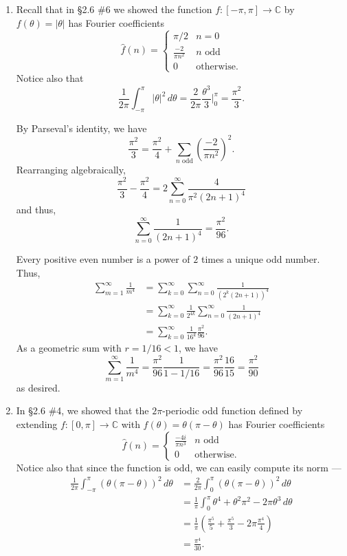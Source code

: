 \documentclass[12 pt, letterpaper]{hmcpset}
\begin{document}
\begin{solution}
	\begin{enumerate}
		\item Recall that in \S 2.6 \#6 we showed the function $f : [-\pi, \pi] \to \mathbb{C}$ by $f(\theta) = \lvert \theta \rvert$ has Fourier coefficients
			\[
				\hat{f}(n) = \begin{cases}
					\pi / 2 & n = 0 \\
					\frac{-2}{\pi n^{2}} & n \text{ odd} \\
					0 & \text{otherwise}.
				\end{cases}
			\]
			Notice also that
			\[
				\frac{1}{2 \pi} \int_{-\pi}^{\pi} \lvert \theta \rvert^{2} \, d\theta = \frac{2}{2 \pi} \frac{\theta^{3}}{3} \Big |_{0}^{\pi} = \frac{\pi^{2}}{3}.
			\]

			By Parseval's identity, we have
			\[
				\frac{\pi^{2}}{3} = \frac{\pi^{2}}{4} + \sum_{n \text{ odd}} \left ( \frac{-2}{\pi n^{2}} \right )^{2}.
			\]
			Rearranging algebraically,
			\[
				\frac{\pi^{2}}{3} - \frac{\pi^{2}}{4} = 2 \sum_{n = 0}^{\infty} \frac{4}{\pi^{2} (2n + 1)^{4}}
			\]
			and thus,
			\[
				\sum_{n = 0}^{\infty} \frac{1}{(2n + 1)^{4}} = \frac{\pi^{2}}{96}.
			\]

			Every positive even number is a power of $2$ times a unique odd number. Thus,
			\begin{align*}
				\sum_{m = 1}^{\infty} \frac{1}{m^{4}} & = \sum_{k = 0}^{\infty} \sum_{n = 0}^{\infty} \frac{1}{(2^{k} (2n + 1))^{4}} \\
								      & = \sum_{k = 0}^{\infty} \frac{1}{2^{4k}} \sum_{n = 0}^{\infty} \frac{1}{(2n + 1)^{4}} \\
								      & = \sum_{k = 0}^{\infty} \frac{1}{16^{k}} \frac{\pi^{2}}{96}.
			\end{align*}
			As a geometric sum with $r = 1/16 < 1$, we have
			\[
				\sum_{m = 1}^{\infty} \frac{1}{m^{4}} = \frac{\pi^{2}}{96} \frac{1}{1 - 1 /16} = \frac{\pi^{2}}{96} \frac{16}{15} = \frac{\pi^{2}}{90}
			\]
			as desired.
		\item In \S 2.6 \#4, we showed that the $2 \pi$-periodic odd function defined by extending $f : [0, \pi] \to \mathbb{C}$ with $f(\theta) = \theta (\pi - \theta)$ has Fourier coefficients
			\[
				\hat{f}(n) = \begin{cases}
					\frac{-4i}{\pi n^{3}} & n \text{ odd} \\
					0 & \text{otherwise}.
				\end{cases}
			\]
			Notice also that since the function is odd, we can easily compute its norm ---
			\begin{align*}
				\frac{1}{2 \pi} \int_{-\pi}^{\pi} (\theta (\pi - \theta))^{2} \, d\theta & = \frac{2}{2 \pi} \int_{0}^{\pi} (\theta (\pi - \theta))^{2} \, d \theta \\
													 & = \frac{1}{\pi} \int_{0}^{\pi} \theta^{4} + \theta^{2} \pi^{2} - 2 \pi \theta^{3} \, d \theta \\
													 & = \frac{1}{\pi} \left ( \frac{\pi^{5}}{5} + \frac{\pi^{5}}{3} - 2 \pi \frac{\pi^{4}}{4} \right ) \\
													 & = \frac{\pi^{4}}{30}.
			\end{align*}


\end{enumerate}
\end{solution}
\end{document}
